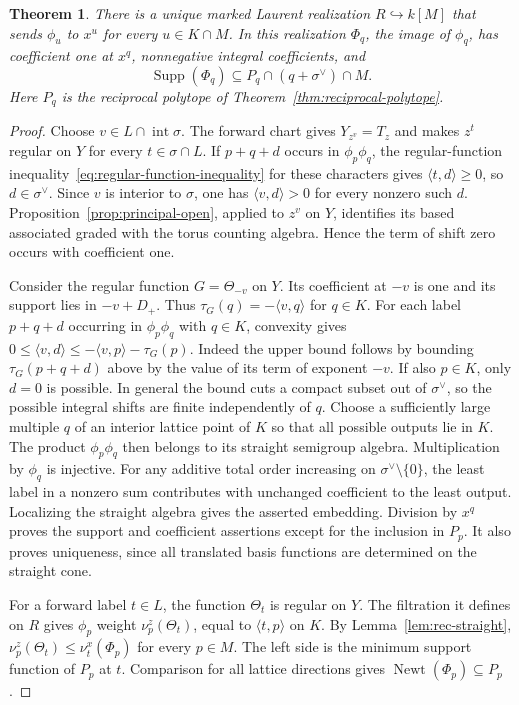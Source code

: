\documentclass[11pt,reqno]{amsart}
\numberwithin{equation}{section}
\newtheorem{theorem}{Theorem}[section]
\theoremstyle{definition}
\theoremstyle{remark}
\DeclareMathOperator{\Newt}{Newt}
\DeclareMathOperator{\Supp}{Supp}
\begin{document}
\begin{theorem}\label{thm:automatic-reverse-chart}
There is a unique marked Laurent realization \(R\hookrightarrow k[M]\)
that sends \(\phi_u\) to \(x^u\) for every \(u\in K\cap M\).
In this realization \(\Phi_q\), the image of \(\phi_q\), has
coefficient one at \(x^q\), nonnegative integral coefficients, and
\[ \Supp(\Phi_q)\subseteq P_q\cap (q+\sigma^\vee)\cap M. \]
Here \(P_q\) is the reciprocal polytope of Theorem~\ref{thm:reciprocal-polytope}.
\end{theorem}
\begin{proof}
Choose \(v\in L\cap\operatorname{int}\sigma\). The forward chart
gives \(Y_{z^v}=T_z\) and makes \(z^t\) regular on \(Y\) for every
\(t\in\sigma\cap L\). If \(p+q+d\) occurs in \(\phi_p\phi_q\),
the regular-function inequality~\eqref{eq:regular-function-inequality} for these characters gives
\(\langle t,d\rangle\ge0\), so \(d\in\sigma^\vee\).
Since \(v\) is interior to \(\sigma\), one has \(\langle v,d\rangle>0\) for every nonzero such \(d\).
Proposition~\ref{prop:principal-open}, applied to \(z^v\) on \(Y\),
identifies its based associated graded with the torus counting algebra.
Hence the term of shift zero occurs with coefficient one.

Consider the regular function \(G=\Theta_{-v}\) on \(Y\).
Its coefficient at \(-v\) is one and its support lies in \(-v+D_+\). Thus \(\tau_G(q)=-\langle v,q\rangle\)
for \(q\in K\). For each label \(p+q+d\) occurring in \(\phi_p\phi_q\) with
\(q\in K\), convexity gives
\(0\le\langle v,d\rangle \le -\langle v,p\rangle-\tau_G(p)\).
Indeed the upper bound follows by bounding \(\tau_G(p+q+d)\) above
by the value of its term of exponent \(-v\). If also \(p\in K\),
only \(d=0\) is possible. In general the bound cuts a compact
subset out of \(\sigma^\vee\), so the possible integral shifts
are finite independently of \(q\). Choose a sufficiently large
multiple \(q\) of an interior lattice point of \(K\) so that all possible
outputs lie in \(K\). The product \(\phi_p\phi_q\) then belongs
to its straight semigroup algebra. Multiplication by \(\phi_q\) is injective. For any additive total
order increasing on \(\sigma^\vee\setminus\{0\}\), the least label in a
nonzero sum contributes with unchanged coefficient to the least output.
Localizing the straight algebra gives the asserted embedding.
Division by \(x^q\) proves the support and coefficient assertions
except for the inclusion in \(P_p\). It also proves uniqueness, since
all translated basis functions are determined on the straight cone.

For a forward label \(t\in L\), the function \(\Theta_t\) is regular
on \(Y\). The filtration it defines on \(R\) gives
\(\phi_p\) weight \(\nu_p^z(\Theta_t)\), equal to
\(\langle t,p\rangle\) on \(K\). By Lemma~\ref{lem:rec-straight},
\(\nu_p^z(\Theta_t)\le\nu_t^x(\Phi_p)\) for every \(p\in M\).
The left side is the minimum support function of \(P_p\) at \(t\).
Comparison for all lattice directions gives
\(\Newt(\Phi_p)\subseteq P_p\).
\end{proof}
\end{document}
